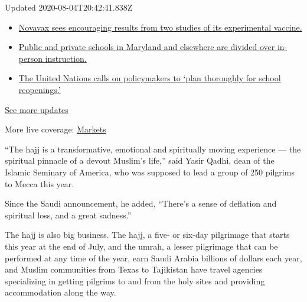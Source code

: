 Updated 2020-08-04T20:42:41.838Z

\begin{itemize}
\tightlist
\item
  \href{https://www.nytimes.com/2020/08/04/world/coronavirus-cases.html?action=click\&pgtype=Article\&state=default\&region=MAIN_CONTENT_1\&context=storylines_live_updates\#link-1228a480}{Novavax
  sees encouraging results from two studies of its experimental
  vaccine.}
\item
  \href{https://www.nytimes.com/2020/08/04/world/coronavirus-cases.html?action=click\&pgtype=Article\&state=default\&region=MAIN_CONTENT_1\&context=storylines_live_updates\#link-4825b93}{Public
  and private schools in Maryland and elsewhere are divided over
  in-person instruction.}
\item
  \href{https://www.nytimes.com/2020/08/04/world/coronavirus-cases.html?action=click\&pgtype=Article\&state=default\&region=MAIN_CONTENT_1\&context=storylines_live_updates\#link-50f7386d}{The
  United Nations calls on policymakers to `plan thoroughly for school
  reopenings.'}
\end{itemize}

\href{https://www.nytimes.com/2020/08/04/world/coronavirus-cases.html?action=click\&pgtype=Article\&state=default\&region=MAIN_CONTENT_1\&context=storylines_live_updates}{See
more updates}

More live coverage:
\href{https://www.nytimes.com/live/2020/08/04/business/stock-market-today-coronavirus?action=click\&pgtype=Article\&state=default\&region=MAIN_CONTENT_1\&context=storylines_live_updates}{Markets}

``The hajj is a transformative, emotional and spiritually moving
experience --- the spiritual pinnacle of a devout Muslim's life,'' said
Yasir Qadhi, dean of the Islamic Seminary of America, who was supposed
to lead a group of 250 pilgrims to Mecca this year.

Since the Saudi announcement, he added, ``There's a sense of deflation
and spiritual loss, and a great sadness.''

The hajj is also big business. The hajj, a five- or six-day pilgrimage
that starts this year at the end of July, and the umrah, a lesser
pilgrimage that can be performed at any time of the year, earn Saudi
Arabia billions of dollars each year, and Muslim communities from Texas
to Tajikistan have travel agencies specializing in getting pilgrims to
and from the holy sites and providing accommodation along the way.

